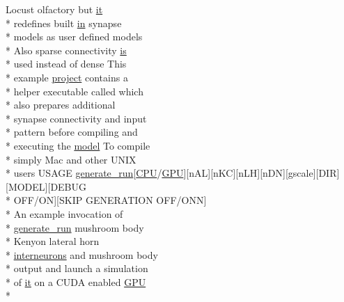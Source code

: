 \begin{DoxyCompactItemize}
\item 
Locust olfactory but \hyperlink{userproject_2PoissonIzh__project_2README_8txt_a3e3bbb6c9b14c38757cf273a117e43e8}{it} \\*
redefines built \hyperlink{README_8txt_a148897a6b2cc9cff25af80abb13426b0}{in} synapse \\*
models as user defined models \\*
Also sparse connectivity \hyperlink{userproject_2MBody__userdef__project_2README_8txt_a7b4e6cf78d14ce882cb8ff127e01babd}{is} \\*
used instead of dense This \\*
example \hyperlink{userproject_2SynDelay__project_2README_8txt_a762c750134e07a31b7965860fd292b51}{project} contains a \\*
helper executable called which \\*
also prepares additional \\*
synapse connectivity and input \\*
pattern before compiling and \\*
executing the \hyperlink{README_8txt_a69fd801b7213948c12d9dd7eebb3ed14}{model} To compile \\*
simply Mac and other U\+N\+I\+X \\*
users U\+S\+A\+G\+E \hyperlink{userproject_2MBody__userdef__project_2README_8txt_a320a215d1e27b4de394be70e90d22863}{generate\+\_\+run}\mbox{[}\hyperlink{README_8txt_a74a069e3c75797de2636c4dd14daa147}{C\+P\+U}/\hyperlink{modelSpec_8h_a39cb9803524b6f3b783344b2f89867b4}{G\+P\+U}\mbox{]}\mbox{[}n\+A\+L\mbox{]}\mbox{[}n\+K\+C\mbox{]}\mbox{[}n\+L\+H\mbox{]}\mbox{[}n\+D\+N\mbox{]}\mbox{[}gscale\mbox{]}\mbox{[}D\+I\+R\mbox{]}\mbox{[}M\+O\+D\+E\+L\mbox{]}\mbox{[}D\+E\+B\+U\+G \\*
O\+F\+F/O\+N\mbox{]}\mbox{[}S\+K\+I\+P G\+E\+N\+E\+R\+A\+T\+I\+O\+N O\+F\+F/O\+N\+N\mbox{]} \\*
An example invocation of \\*
\hyperlink{userproject_2MBody__userdef__project_2README_8txt_a320a215d1e27b4de394be70e90d22863}{generate\+\_\+run} mushroom body \\*
Kenyon lateral horn \\*
\hyperlink{userproject_2SynDelay__project_2README_8txt_adf6327d22e2c11a62a22ab5afd4f2b81}{interneurons} and mushroom body \\*
output and launch a simulation \\*
of \hyperlink{userproject_2PoissonIzh__project_2README_8txt_a3e3bbb6c9b14c38757cf273a117e43e8}{it} on a C\+U\+D\+A enabled \hyperlink{modelSpec_8h_a39cb9803524b6f3b783344b2f89867b4}{G\+P\+U} \\*

\end{DoxyCompactItemize}
